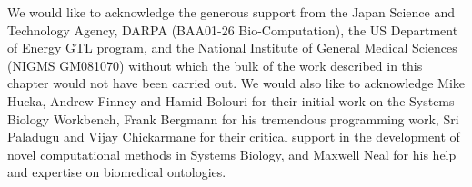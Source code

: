 \documentclass[]{article}
\begin{document}
We would like to acknowledge the generous support from the Japan Science
and Technology Agency, DARPA (BAA01-26 Bio-Computation), the US
Department of Energy GTL program, and the National Institute of General
Medical Sciences (NIGMS GM081070) without which the bulk of the work
described in this chapter would not have been carried out. We would also
like to acknowledge Mike Hucka, Andrew Finney and Hamid Bolouri for
their initial work on the Systems Biology Workbench, Frank Bergmann for
his tremendous programming work, Sri Paladugu and Vijay Chickarmane for
their critical support in the development of novel computational methods
in Systems Biology, and Maxwell Neal for his help and expertise on
biomedical ontologies.

\printbibliography[title=References]
\end{document}
